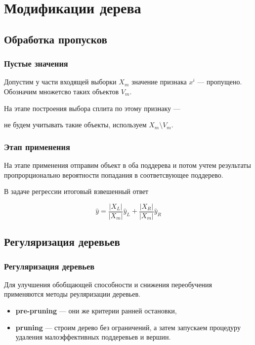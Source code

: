 \documentclass{beamer}
\begin{document}
	\section{Модификации дерева}

	\subsection{Обработка пропусков}

	\begin{frame}
		\frametitle{Пустые значения}

		Допустим у части входящей выборки $X_m$ значение признака $x^i$ --- пропущено.
		Обозначим множетсво таких объектов $V_m$.

		\vspace{15pt}

		На этапе построения выбора сплита по этому признаку ---

		не будем учитывать такие объекты, используем  $X_m \setminus V_m$.
	\end{frame}

	\begin{frame}
		\frametitle{Этап применения}

		На этапе применения отправим объект в оба поддерева и потом учтем результаты
		пропрорционально вероятности попадания в соответсвующее поддерево.

		\vspace{15pt}

		В задаче регрессии итоговый взвешенный ответ

		\[
		\hat{y} = \frac{|X_L|}{|X_m|} \hat{y}_L + \frac{|X_R|}{|X_m|} \hat{y}_R
		\]
	\end{frame}

	\subsection{Регуляризация деревьев}

	\begin{frame}
		\frametitle{Регуляризация деревьев}

		Для улучшения обобщающей способности и снижения переобучения применяются методы 
		реуляризации деревьев.

		\begin{itemize}
			\item \textbf{pre-pruning} --- они же критерии ранней остановки,
			\item \textbf{pruning} --- строим дерево без ограничений, а затем запускаем процедуру
			удаления малоэффективных поддеревьев и вершин.
		\end{itemize}
	\end{frame}
\end{document}
